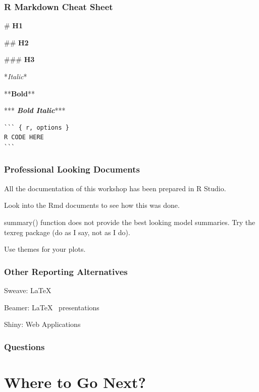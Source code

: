 \documentclass{beamer}\usepackage[]{graphicx}\usepackage[]{color}
\begin{document}
\begin{frame}[fragile]
\frametitle{R Markdown Cheat Sheet}

\#   {\Huge \textbf{H1}}

\#\#  {\Large \textbf{H2}}

\#\#\# \textbf{H3} \vfill

*{\textit{Italic}}*

**{\textbf{Bold}}**

***{\textit{ \textbf{Bold Italic}}}*** \vfill

\begin{verbatim}
``` { r, options }
R CODE HERE
```
\end{verbatim}

\end{frame}


\begin{frame}
\frametitle{Professional Looking Documents}

All the documentation of this workshop has been prepared in R Studio. \vfill

Look into the Rmd documents to see how this was done. \vfill

summary() function does not provide the best looking model summaries.
Try the texreg package (do as I say, not as I do).\vfill

Use themes for your plots.

\end{frame}


\begin{frame}
\frametitle{Other Reporting Alternatives}

Sweave: \LaTeX \vfill

Beamer: \LaTeX ~ presentations \vfill

Shiny: Web Applications \vfill

\end{frame}


\begin{frame}
	\frametitle{Questions}
	\begin{center}
		\vfill
		\vfill
	\end{center}
\end{frame}


\section{Where to Go Next?}
\end{document}
